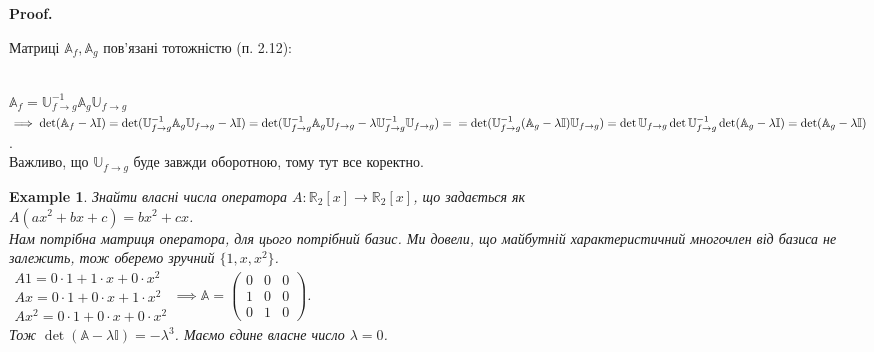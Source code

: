 \documentclass[a4paper, 10pt]{article}
\makeatletter
\theoremstyle{theoremdd}
\newtheorem{example}[theorem]{Example}
\renewenvironment{proof}[1][Proof.\\]{\par
\pushQED{\hfill \qed}%
\normalfont \topsep6\p@\@plus6\p@\relax
\trivlist
\item\relax
{\bfseries
#1\@addpunct{.}}\hspace\labelsep\ignorespaces
}{%
\popQED\endtrivlist\@endpefalse
}
\makeatother
\begin{document}
\begin{proof}
Матриці $\mathbb{A}_f, \mathbb{A}_g$ пов'язані тотожністю (п. 2.12):\\
\\
$\mathbb{A}_f = \mathbb{U}^{-1}_{f \to g} \mathbb{A}_g \mathbb{U}_{f \to g}$\\
$\implies \det(\mathbb{A}_f - \lambda \mathbb{I}) = \det(\mathbb{U}^{-1}_{f \to g} \mathbb{A}_g \mathbb{U}_{f \to g} - \lambda \mathbb{I}) = \det(\mathbb{U}^{-1}_{f \to g} \mathbb{A}_g \mathbb{U}_{f \to g} - \lambda \mathbb{U}^{-1}_{f \to g} \mathbb{U}_{f \to g}) = \\ = \det(\mathbb{U}^{-1}_{f \to g}(\mathbb{A}_g-\lambda \mathbb{I})\mathbb{U}_{f \to g}) = \det \mathbb{U}_{f \to g} \det \mathbb{U}_{f \to g}^{-1} \det (\mathbb{A}_g - \lambda \mathbb{I}) = \det (\mathbb{A}_g - \lambda \mathbb{I})$.\\
Важливо, що $\mathbb{U}_{f \to g}$ буде завжди оборотною, тому тут все коректно.
\end{proof}

\begin{example}
Знайти власні числа оператора $A \colon \mathbb{R}_2[x] \to \mathbb{R}_2[x]$, що задається як\\
$A(ax^2+bx+c) = bx^2 + cx$.\\
Нам потрібна матриця оператора, для цього потрібний базис. Ми довели, що майбутній характеристичний многочлен від базиса не залежить, тож оберемо зручний $\{1,x,x^2\}$.\\
$\begin{gathered} A1 = 0 \cdot 1 + 1 \cdot x + 0 \cdot x^2 \\ Ax = 0 \cdot 1 + 0 \cdot x + 1 \cdot x^2 \\ Ax^2 = 0 \cdot 1 + 0 \cdot x + 0 \cdot x^2 \end{gathered} \implies \mathbb{A} = \begin{pmatrix}
0 & 0 & 0 \\
1 & 0 & 0 \\
0 & 1 & 0
\end{pmatrix}$.\\
Тож $\det (\mathbb{A}-\lambda \mathbb{I}) = -\lambda^3$. Маємо єдине власне число $\lambda = 0$.
\end{example}
\end{document}
